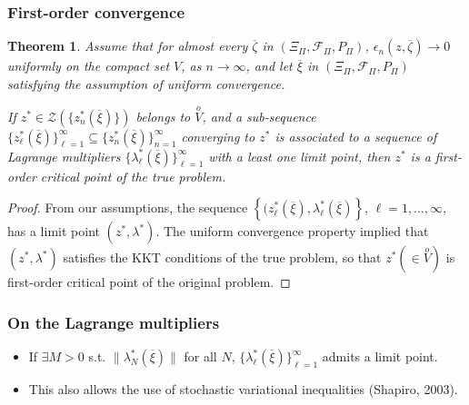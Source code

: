 \documentclass{beamer}
\newtheorem{theo}{Theorem}
\begin{document}
\begin{frame}
\frametitle{First-order convergence}

\begin{small}

\begin{theo}
\label{th:fod_first}
Assume that for almost every $\overline \zeta$ in $(\Xi_{\Pi}, \mathcal{F}_{\Pi}, P_{\Pi})$, $\epsilon_n(z, \overline{\zeta}) \rightarrow 0$ uniformly on the compact set $V$, as $n \rightarrow \infty$, and let $\overline \xi$ in $(\Xi_{\Pi}, \mathcal{F}_{\Pi}, P_{\Pi})$ satisfying the assumption of uniform convergence.

If $z^* \in \mathcal{Z}\left(\lbrace z^*_n(\overline{\xi})\rbrace\right)$ belongs to $\overset{o}{V}$, and a sub-sequence $\lbrace z^*_{\ell}(\overline{\xi}) \rbrace_{\ell = 1}^{\infty} \subseteq \lbrace z^*_n (\overline{\xi}) \rbrace_{n = 1}^{\infty}$ converging to $z^*$ is associated to a sequence of Lagrange multipliers $\lbrace \lambda^*_{\ell} (\overline{\xi}) \rbrace_{\ell = 1}^{\infty}$ with a least one limit point, then $z^*$ is a first-order critical point of the true problem.
\end{theo}

\begin{proof}
From our assumptions, the sequence $\left\lbrace (z^*_{\ell}(\overline{\xi}), \lambda^*_{\ell}(\overline{\xi}) \right\rbrace$, $\ell=1,\ldots,\infty$, has a limit point $( z^*, \lambda^* )$.
The uniform convergence property implied that $( z^*, \lambda^* )$ satisfies the KKT conditions of the true problem, so that $z^* (\in \overset{o}{V})$ is first-order critical point of the original problem.
\end{proof}

\end{small}

\end{frame}

\begin{frame}
\frametitle{On the Lagrange multipliers}

\begin{itemize}
	\item 
If $\exists M > 0$ s.t. $\| \lambda^*_N (\overline{\xi}) \|$ for all $N$, 
$\lbrace \lambda^*_{\ell} (\overline{\xi}) \rbrace_{\ell = 1}^{\infty}$ admits a limit point.
\item 
This also allows the use of stochastic variational inequalities (Shapiro, 2003).
\end{itemize}

\end{frame}
\end{document}
